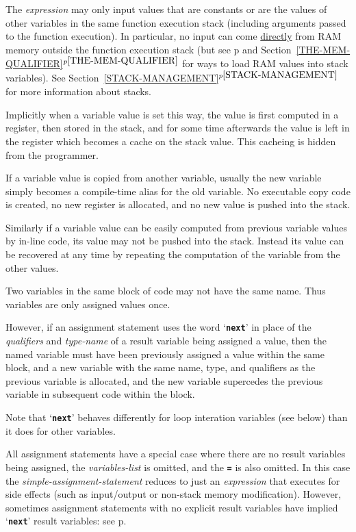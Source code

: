 \documentclass[12pt]{article}
\newcommand{\TT}[1]{{\tt \bfseries #1}}
\newcommand{\itemref}[1]{\ref{#1}$^{p\pageref{#1}}$}
\newcommand{\pagref}[1]{p\pageref{#1}}
\begin{document}
The {\em expression} may only input values that are constants or are
the values of other variables in the same function execution
stack (including
arguments passed to the function execution).  In particular,
no input can come \underline{directly}
from RAM memory outside the function execution stack
(but see \pagref{MEM} and Section~\itemref{THE-MEM-QUALIFIER}
for ways to load RAM values into stack variables).
See Section~\itemref{STACK-MANAGEMENT} for more information about stacks.

Implicitly when a variable value is set this way, the value is first
computed in a register, then stored in the stack, and for some time
afterwards the value is left in the register which becomes a cache
on the stack value.  This cacheing is hidden from the programmer.

If a variable value is copied from another variable, usually the
new variable simply becomes a compile-time alias for the old variable.
No executable copy code is created, no new register is allocated, and no new
value is pushed into the stack.

Similarly if a variable value can be easily computed from previous variable
values by in-line code, 
its value may not be pushed into the stack.  Instead its
value can be recovered at any time by repeating the computation
of the variable from the other values.

Two variables in the same block of code may not have the same
name.  Thus variables are only assigned values once.

However, if an assignment statement uses the word `\TT{next}' in
place of the {\em qualifiers} and {\em type-name}
of a result variable being assigned a value, then the named variable must
have been previously assigned a value within the same block,
and a new variable with the same
name, type, and qualifiers as the previous variable is allocated,
and the new variable supercedes the previous variable in subsequent code within
the block.

Note that `\TT{next}' behaves differently for loop interation
variables (see below) than it does for other variables.

All assignment statements have a special case where there are
no result variables being assigned, the {\em variables-list} is omitted,
and the \TT{=} is also omitted.  In this case the
{\em simple-assignment-statement} reduces to just an {\em expression}
that executes for side effects (such as
input/output or non-stack memory modification).
However, sometimes assignment statements with no explicit
result variables have implied `\TT{next}' result variables:
see \pagref{IMPLIED-NEXT-VARIABLES}.
\end{document}
